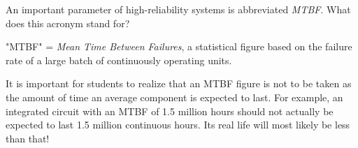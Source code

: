 

An important parameter of high-reliability systems is abbreviated {\it MTBF}.  What does this acronym stand for?







"MTBF" = {\it Mean Time Between Failures}, a statistical figure based on the failure rate of a large batch of continuously operating units.







It is important for students to realize that an MTBF figure is not to be taken as the amount of time an average component is expected to last.  For example, an integrated circuit with an MTBF of 1.5 million hours should not actually be expected to last 1.5 million continuous hours.  Its real life will most likely be less than that!




